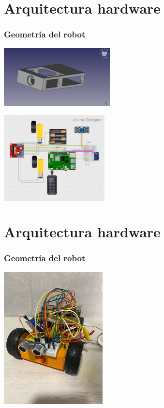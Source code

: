 \documentclass{beamer}
\begin{document}
\section{Arquitectura hardware}
\begin{frame}
\frametitle{Geometría del robot}
\centering
\begin{minipage}{0.45\textwidth}
    \centering
    \includegraphics[width=5.8cm]{figs/base.png}
\end{minipage}
\hfill
\begin{minipage}{0.45\textwidth}
    \centering
    \includegraphics[width=5.5cm]{figs/final_circuito.png}
\end{minipage}

\end{frame}

\section{Arquitectura hardware}
\begin{frame}
\frametitle{Geometría del robot}
\centering
\begin{minipage}{0.45\textwidth}
    \centering
    \includegraphics[width=5.4cm]{figs/rob.jpeg}
\end{minipage}


\end{frame}
\end{document}
